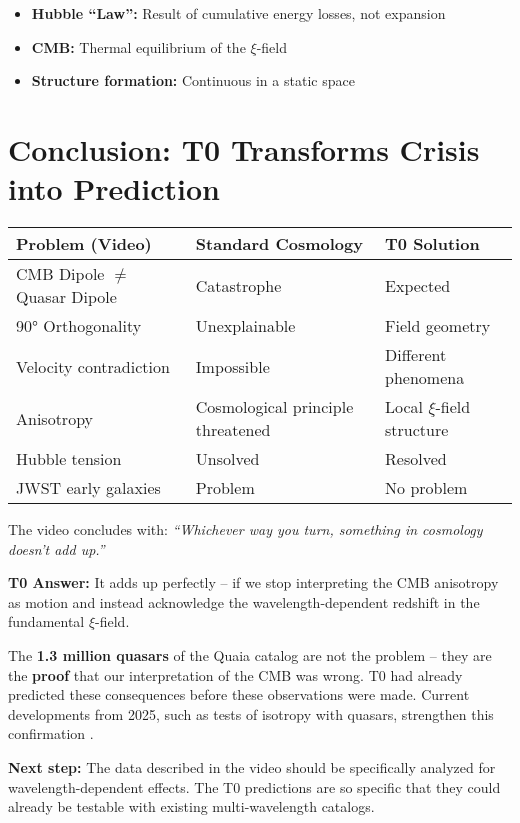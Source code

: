 \documentclass{article}
\begin{document}
	\begin{itemize}
		\item \textbf{Hubble ``Law'':} Result of cumulative energy losses, not expansion
		\item \textbf{CMB:} Thermal equilibrium of the $\xi$-field  
		\item \textbf{Structure formation:} Continuous in a static space
	\end{itemize}
	
	\section{Conclusion: T0 Transforms Crisis into Prediction}
	
	\begin{tabular}{p{3.5cm}|p{6cm}|p{5.5cm}}
		\textbf{Problem (Video)} & \textbf{Standard Cosmology} & \textbf{T0 Solution} \\
		\hline
		CMB Dipole $\neq$ Quasar Dipole & Catastrophe \cite{mittal2024} & Expected \\
		90° Orthogonality & Unexplainable \cite{secrest2024} & Field geometry \\
		Velocity contradiction & Impossible & Different phenomena \\
		Anisotropy & Cosmological principle threatened & Local $\xi$-field structure \\
		Hubble tension & Unsolved & Resolved \\
		JWST early galaxies & Problem & No problem \\
	\end{tabular}
	
	The video concludes with: \textit{``Whichever way you turn, something in cosmology doesn't add up.''}
	
	\textbf{T0 Answer:} It adds up perfectly -- if we stop interpreting the CMB anisotropy as motion and instead acknowledge the wavelength-dependent redshift in the fundamental $\xi$-field.
	
	The \textbf{1.3 million quasars} of the Quaia catalog are not the problem -- they are the \textbf{proof} that our interpretation of the CMB was wrong. T0 had already predicted these consequences before these observations were made. Current developments from 2025, such as tests of isotropy with quasars, strengthen this confirmation \cite{sarkar2025}.
	
	\textbf{Next step:} The data described in the video should be specifically analyzed for wavelength-dependent effects. The T0 predictions are so specific that they could already be testable with existing multi-wavelength catalogs.
	
\end{document}
